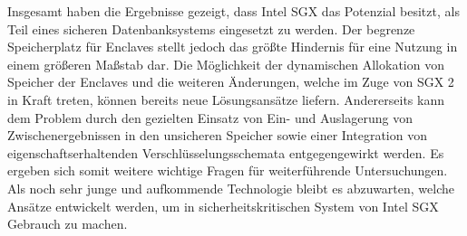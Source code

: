 Insgesamt haben die Ergebnisse gezeigt, dass Intel SGX das Potenzial besitzt, als Teil eines sicheren Datenbanksystems eingesetzt zu werden. Der begrenze Speicherplatz für Enclaves stellt jedoch das größte Hindernis für eine Nutzung in einem größeren Maßstab dar. Die Möglichkeit der dynamischen Allokation von Speicher der Enclaves und die weiteren Änderungen, welche im Zuge von SGX 2 in Kraft treten, können bereits neue Lösungsansätze liefern. Andererseits kann dem Problem durch den gezielten Einsatz von Ein- und Auslagerung von Zwischenergebnissen in den unsicheren Speicher sowie einer Integration von eigenschaftserhaltenden Verschlüsselungsschemata entgegengewirkt werden. Es ergeben sich somit weitere wichtige Fragen für weiterführende Untersuchungen. Als noch sehr junge und aufkommende Technologie bleibt es abzuwarten, welche Ansätze entwickelt werden, um in sicherheitskritischen System von Intel SGX Gebrauch zu machen.